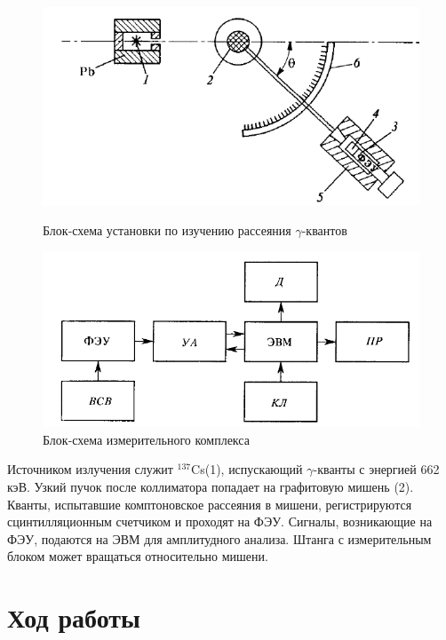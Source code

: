 \documentclass[a4paper]{article}
\begin{document}
        \begin{figure}[h]
\begin{center}
\begin{minipage}[h]{0.48\linewidth}
\includegraphics[width=1\linewidth]{fig2.PNG}
\caption{Блок-схема установки по изучению рассеяния $\gamma$-квантов} %
\end{minipage}
\hfill 
\begin{minipage}[h]{0.48\linewidth}
\includegraphics[width=1\linewidth]{fig3.PNG}
\caption{Блок-схема измерительного комплекса}
\label{ris:experimcoded}
\end{minipage}
\end{center}
\end{figure}

Источником излучения служит $^{137}$Cs(1), испускающий  $\gamma$-кванты с энергией 662 кэВ. Узкий пучок после коллиматора попадает на графитовую мишень (2). Кванты, испытавшие комптоновское рассеяния в мишени, регистрируются сцинтилляционным счетчиком и проходят на ФЭУ. Сигналы, возникающие на ФЭУ, подаются на ЭВМ для амплитудного анализа. Штанга с измерительным блоком может вращаться относительно мишени.

\section{Ход работы}
\end{document}

